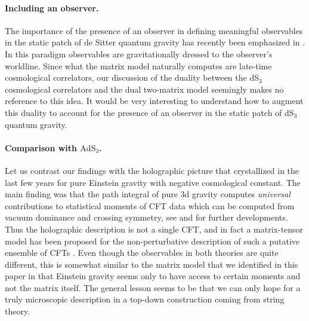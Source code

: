 \documentclass[12pt,a4paper]{article}
\begin{document}
\paragraph{Including an observer.}
The importance of the presence of an observer in defining meaningful observables in the static patch of de Sitter quantum gravity has recently been emphasized in \cite{Anninos:2011af, Chandrasekaran:2022cip, Loganayagam:2023pfb}. In this paradigm observables are gravitationally dressed to the observer's worldline. Since what the matrix model naturally computes are late-time cosmological correlators, our discussion of the duality between the dS$_3$ cosmological correlators and the dual two-matrix model seemingly makes no reference to this idea. It would be very interesting to understand how to augment this duality to account for the presence of an observer in the static patch of dS$_3$ quantum gravity. 

\paragraph{Comparison with $\mathrm{AdS}_3$.} Let us contrast our findings with the holographic picture that crystallized in the last few years for pure Einstein gravity with negative cosmological constant. The main finding was that the path integral of pure 3d gravity computes \emph{universal} contributions to statistical moments of CFT data which can be computed from vacuum dominance and crossing symmetry, see \cite{Belin:2020hea, Chandra:2022bqq} and \cite{Collier:2024mgv,deBoer:2024mqg} for further developments. Thus the holographic description is not a single CFT, and in fact a  matrix-tensor model has been proposed for the non-perturbative description of such a putative ensemble of CFTs \cite{Belin:2023efa,Jafferis:2024jkb}.
Even though the observables in both theories are quite different, this is somewhat similar to the matrix model that we identified in this paper in that Einstein gravity seems only to have access to certain moments and not the matrix itself. The general lesson seems to be that we can only hope for a truly microscopic description in a top-down construction coming from string theory. 
\end{document}
